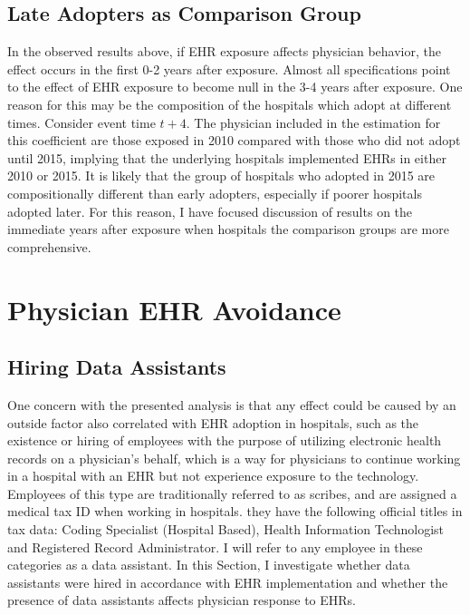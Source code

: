 \documentclass[11pt]{article}
\begin{document}
\subsection{Late Adopters as Comparison Group}

In the observed results above, if EHR exposure affects physician behavior, the effect occurs in the first 0-2 years after exposure. Almost all specifications point to the effect of EHR exposure to become null in the 3-4 years after exposure. One reason for this may be the composition of the hospitals which adopt at different times. Consider event time $t+4$. The physician included in the estimation for this coefficient are those exposed in 2010 compared with those who did not adopt until 2015, implying that the underlying hospitals implemented EHRs in either 2010 or 2015. It is likely that the group of hospitals who adopted in 2015 are compositionally different than early adopters, especially if poorer hospitals adopted later. For this reason, I have focused discussion of results on the immediate years after exposure when hospitals the comparison groups are more comprehensive. 


\section{Physician EHR Avoidance}

\subsection{Hiring Data Assistants}\label{sec:dataass}

One concern with the presented analysis is that any effect could be caused by an outside factor also correlated with EHR adoption in hospitals, such as the existence or hiring of employees with the purpose of utilizing electronic health records on a physician's behalf, which is a way for physicians to continue working in a hospital with an EHR but not experience exposure to the technology. Employees of this type are traditionally referred to as scribes, and are assigned a medical tax ID when working in hospitals. they have the following official titles in tax data: Coding Specialist (Hospital Based), Health Information Technologist and Registered Record Administrator. I will refer to any employee in these categories as a data assistant. In this Section, I investigate whether data assistants were hired in accordance with EHR implementation and whether the presence of data assistants affects physician response to EHRs.  
\end{document}
